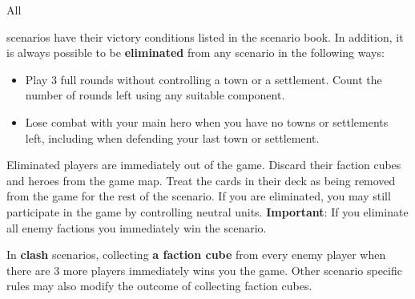 \hypertarget{End}{All} scenarios have their victory conditions listed in the scenario book.
In addition, it is always possible to be \textbf{eliminated} from any scenario in the following ways:
\begin{itemize}
  \item Play 3 full rounds without controlling a town or a settlement.
Count the number of rounds left using any suitable component.
  \item Lose combat with your main hero when you have no towns or settlements left, including when defending your last town or settlement.
\end{itemize}
Eliminated players are immediately out of the game.
Discard their faction cubes and heroes from the game map.
Treat the cards in their deck as being removed from the game for the rest of the scenario.
If you are eliminated, you may still participate in the game by controlling neutral units.
\textbf{Important}: If you eliminate all enemy factions you immediately win the scenario.\par
In \textbf{clash} scenarios, collecting \textbf{a faction cube} from every enemy player when there are 3 more players immediately wins you the game.
Other scenario specific rules may also modify the outcome of collecting faction cubes.
